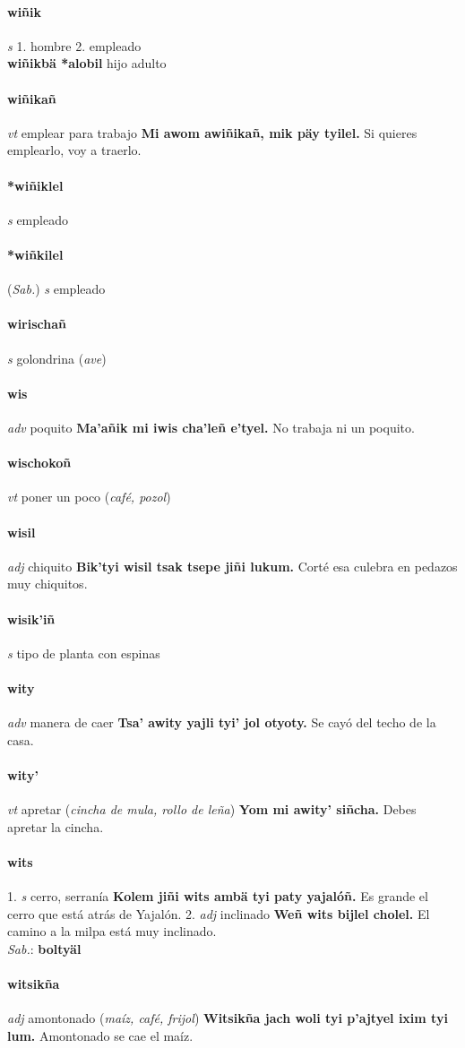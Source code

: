 \documentclass{scrbook}
\newcommand{\entry}[1]{\paragraph{#1}}
\newcommand{\onedefinition}[1]{#1.}
\newcommand{\partofspeech}[1]{\textit{#1}}
\newcommand{\spanishtranslation}[1]{#1}
\newcommand{\clarification}[1]{(\textit{#1})}
\newcommand{\cholexample}[1]{\textbf{#1}}
\newcommand{\exampletranslation}[1]{#1}
\newcommand{\dialectvariant}[1]{\\\textit{#1}:}
\newcommand{\dialectword}[1]{\textbf{#1}}
\newcommand{\relevantdialect}[1]{(\textit{#1})}
\newcommand{\secondaryentry}[1]{\\\textbf{#1}}
\newcommand{\secondtranslation}[1]{#1}
\begin{document}
\begin{multicols}{2}
\entry{wiñik}
\partofspeech{s}
\onedefinition{1}
\spanishtranslation{hombre}
\onedefinition{2}
\spanishtranslation{empleado}
\secondaryentry{wiñikbä *alobil}
\secondtranslation{hijo adulto}

\entry{wiñikañ}
\partofspeech{vt}
\spanishtranslation{emplear para trabajo}
\cholexample{Mi awom awiñikañ, mik päy tyilel.}
\exampletranslation{Si quieres emplearlo, voy a traerlo.}

\entry{*wiñiklel}
\partofspeech{s}
\spanishtranslation{empleado}

\entry{*wiñkilel}
\relevantdialect{Sab.}
\partofspeech{s}
\spanishtranslation{empleado}

\entry{wirischañ}
\partofspeech{s}
\spanishtranslation{golondrina}
\clarification{ave}

\entry{wis}
\partofspeech{adv}
\spanishtranslation{poquito}
\cholexample{Ma'añik mi iwis cha'leñ e'tyel.}
\exampletranslation{No trabaja ni un poquito.}

\entry{wischokoñ}
\partofspeech{vt}
\spanishtranslation{poner un poco}
\clarification{café, pozol}

\entry{wisil}
\partofspeech{adj}
\spanishtranslation{chiquito}
\cholexample{Bik'tyi wisil tsak tsepe jiñi lukum.}
\exampletranslation{Corté esa culebra en pedazos muy chiquitos.}

\entry{wisik'iñ}
\partofspeech{s}
\spanishtranslation{tipo de planta con espinas}

\entry{wity}
\partofspeech{adv}
\spanishtranslation{manera de caer}
\cholexample{Tsa' awity yajli tyi' jol otyoty.}
\exampletranslation{Se cayó del techo de la casa.}

\entry{wity'}
\partofspeech{vt}
\spanishtranslation{apretar}
\clarification{cincha de mula, rollo de leña}
\cholexample{Yom mi awity' siñcha.}
\exampletranslation{Debes apretar la cincha.}

\entry{wits}
\onedefinition{1}
\partofspeech{s}
\spanishtranslation{cerro, serranía}
\cholexample{Kolem jiñi wits ambä tyi paty yajalóñ.}
\exampletranslation{Es grande el cerro que está atrás de Yajalón.}
\onedefinition{2}
\partofspeech{adj}
\spanishtranslation{inclinado}
\cholexample{Weñ wits bijlel cholel.}
\exampletranslation{El camino a la milpa está muy inclinado.}
\dialectvariant{Sab.}
\dialectword{boltyäl}

\entry{witsikña}
\partofspeech{adj}
\spanishtranslation{amontonado}
\clarification{maíz, café, frijol}
\cholexample{Witsikña jach woli tyi p'ajtyel ixim tyi lum.}
\exampletranslation{Amontonado se cae el maíz.}


\end{multicols}
\end{document}
